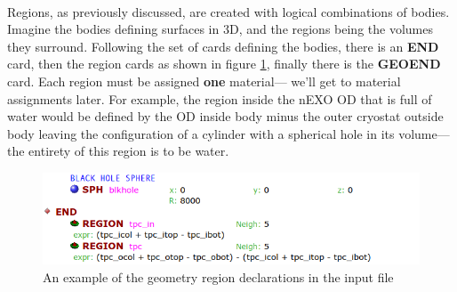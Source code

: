 \documentclass[10pt]{article}
\begin{document}
\paragraph{}
Regions, as previously discussed, are created with logical combinations of bodies. Imagine the bodies defining surfaces in 3D, and the regions being the volumes they surround. Following the set of cards defining the bodies, there is an \textbf{END} card, then the region cards as shown in figure \ref{fig:geometry2}, finally there is the \textbf{GEOEND} card. Each region must be assigned \textbf{one} material— we'll get to material assignments later. For example, the region inside the nEXO OD that is full of water would be defined by the OD inside body minus the outer cryostat outside body leaving the configuration of a cylinder with a spherical hole in its volume— the entirety of this region is to be water. 

\begin{figure}[h]
    \begin{center}
    \includegraphics[scale=0.5]{figures/geometry_2.png}
    \caption{An example of the geometry region declarations in the input file}
    \label{fig:geometry2}
    \end{center}
\end{figure}
\end{document}
